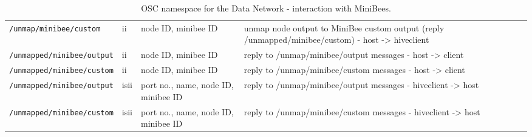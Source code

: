 \documentclass[letterpaper,10pt]{article}
\begin{document}
\begin{sidewaystable}[!tbp]
\begin{center}
\begin{tabular}{|llll|}
\verb|/unmap/minibee/custom| & ii & node ID, minibee ID & unmap node output to MiniBee custom output (reply /unmapped/minibee/custom) - host -> hiveclient\\
\verb|/unmapped/minibee/output| & ii & node ID, minibee ID & reply to /unmap/minibee/output messages - host -> client\\
\verb|/unmapped/minibee/custom| & ii & node ID, minibee ID & reply to /unmap/minibee/custom messages - host -> client \\
\verb|/unmapped/minibee/output| & isii & port no., name, node ID, minibee ID & reply to /unmap/minibee/output messages - hiveclient -> host \\
\verb|/unmapped/minibee/custom| & isii & port no., name, node ID, minibee ID & reply to /unmap/minibee/custom messages - hiveclient -> host \\
\hline

\end{tabular}
\end{center}
\caption{OSC namespace for the Data Network - interaction with MiniBees. }
\label{oscinterfaceMB}
 \end{sidewaystable}
\end{document}

